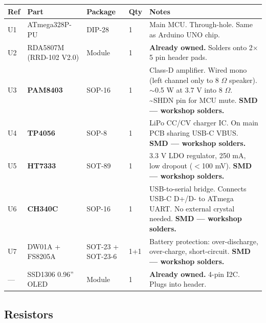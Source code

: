 \documentclass[a4paper,11pt]{article}
\renewcommand*{\,}{ }%
\begin{document}
\begin{longtable}{@{}p{1cm}p{4cm}p{1.5cm}p{1cm}p{5cm}@{}}
\toprule
\textbf{Ref} & \textbf{Part} & \textbf{Package} & \textbf{Qty} & \textbf{Notes} \\
\midrule
\endhead
U1 & ATmega328P-PU & DIP-28 & 1 & Main MCU. Through-hole. Same as Arduino UNO chip. \\
U2 & RDA5807M (RRD-102 V2.0) & Module & 1 & \textbf{Already owned.} Solders onto 2$\times$5 pin header pads. \\
U3 & \textbf{PAM8403} & SOP-16 & 1 & Class-D amplifier. Wired mono (left channel only to 8\,$\Omega$ speaker). $\sim$0.5\,W at 3.7\,V into 8\,$\Omega$. \textasciitilde{}SHDN pin for MCU mute. \textbf{SMD --- workshop solders.} \\
U4 & \textbf{TP4056} & SOP-8 & 1 & LiPo CC/CV charger IC. On main PCB sharing USB-C VBUS. \textbf{SMD --- workshop solders.} \\
U5 & \textbf{HT7333} & SOT-89 & 1 & 3.3\,V LDO regulator, 250\,mA, low dropout ($<$100\,mV). \textbf{SMD --- workshop solders.} \\
U6 & \textbf{CH340C} & SOP-16 & 1 & USB-to-serial bridge. Connects USB-C D+/D- to ATmega UART. No external crystal needed. \textbf{SMD --- workshop solders.} \\
U7 & DW01A + FS8205A & SOT-23 + SOT-23-6 & 1+1 & Battery protection: over-discharge, over-charge, short-circuit. \textbf{SMD --- workshop solders.} \\
--- & SSD1306 0.96'' OLED & Module & 1 & \textbf{Already owned.} 4-pin I2C. Plugs into header. \\
\bottomrule
\end{longtable}

\subsection{Resistors}
\end{document}
